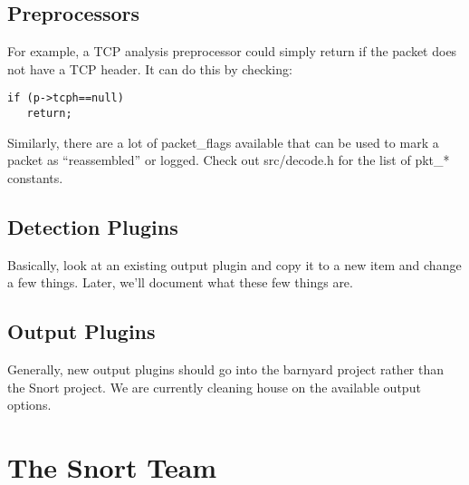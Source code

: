 \documentclass[english]{report}
\begin{document}
\subsection{Preprocessors}

For example, a TCP analysis preprocessor could simply return if the
packet does not have a TCP header. It can do this by checking: 

\begin{verbatim}
if (p->tcph==null)
   return;
\end{verbatim}
Similarly, there are a lot of packet\_flags available that can be
used to mark a packet as ``reassembled'' or logged. Check out src/decode.h
for the list of pkt\_{*} constants.


\subsection{Detection Plugins}
Basically, look at an existing output plugin and copy it to a new item
and change a few things. Later, we'll document what these few things are.

\subsection{Output Plugins}
Generally, new output plugins should go into the barnyard project
rather than the Snort project. We are currently cleaning house on the
available output options.

\section{The Snort Team}
\end{document}

